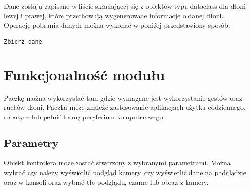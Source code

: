 \quad Dane zostają zapisane w liście składającej się z obiektów typu dataclass dla dłoni lewej i prawej, które przechowują wygenerowane informacje o danej dłoni. Operację pobrania danych można wykonać w poniżej przedstawiony sposób. 

\begin{lstlisting}[language=python]
    Zbierz dane
\end{lstlisting}

\section{Funkcjonalność modułu}
\quad Paczkę można wykorzystać tam gdzie wymagane jest wykorzystanie gestów oraz ruchów dłoni. Paczka może znaleźć zastosowanie aplikacjach użytku codziennego, robotyce lub pełnić formę peryferium komputerowego.  

\subsection{Parametry}
\quad Obiekt kontrolera może zostać stworzony z wybranymi parametrami. Można wybrać czy należy wyświetlić podgląd kamery, czy wyświetlić dane na podglądzie oraz w konsoli oraz wybrać tło podglądu, czarne lub obraz z kamery. 



